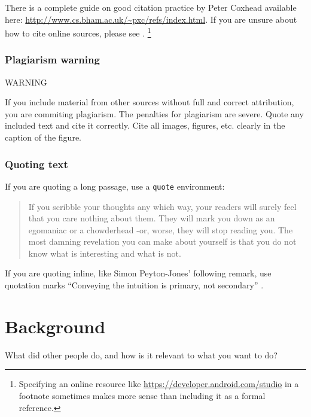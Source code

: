 \documentclass{l4proj}
\begin{document}
There is a complete guide on good citation practice by Peter Coxhead available here: \url{http://www.cs.bham.ac.uk/~pxc/refs/index.html}. 
If you are unsure about how to cite online sources, please see \citet{UNSWWebsite}. 
\footnote{Specifying an online resource like \url{https://developer.android.com/studio}
in a footnote sometimes makes more sense than including it as a formal reference.}

\subsection{Plagiarism warning}

\begin{highlight_title}{WARNING}
    
    If you include material from other sources without full and correct attribution, you are commiting plagiarism. The penalties for plagiarism are severe.
    Quote any included text and cite it correctly. Cite all images, figures, etc. clearly in the caption of the figure.
\end{highlight_title}

\subsection{Quoting text}

If you are quoting a long passage, use a \texttt{quote} environment:

\begin{quote}
     If you scribble your thoughts any which way, your readers will surely feel that you care nothing about them. They will mark you down as an egomaniac or a chowderhead -or, worse, they will stop reading you. The most damning revelation you can make about yourself is that you do not know what is interesting and what is not.
\end{quote} \citep{Von80}

If you are quoting inline, like Simon Peyton-Jones' following remark, use quotation marks ``Conveying the intuition is primary, not
secondary'' \citep{Pey17}.


\chapter{Background}
What did other people do, and how is it relevant to what you want to do?
\end{document}
